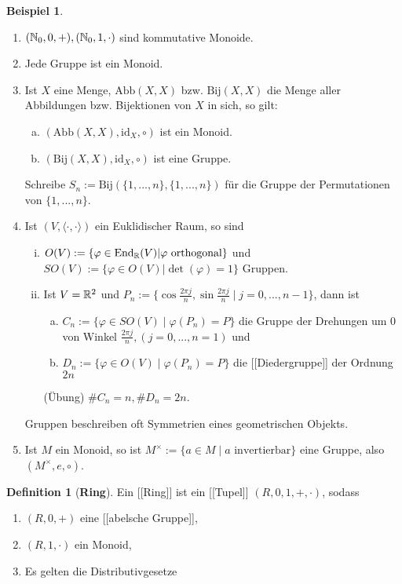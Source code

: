 \documentclass[a4paper]{report}
\theoremstyle{plain}
\theoremstyle{definition}
\newtheorem{defi}[thm]{Definition}
\newtheorem*{bsp*}{Beispiel}
\begin{document}
\begin{bsp*}
  \begin{enumerate}[1)]
\item $(\Bbb N_{0}, 0, +), (\Bbb N_{0}, 1, \cdot)$ sind kommutative Monoide.
\item Jede Gruppe ist ein Monoid.
\item Ist $X$ eine Menge, $\mathrm{Abb}(X,X)$ bzw. $\mathrm{Bij}(X,X)$ die Menge aller Abbildungen bzw. Bijektionen von $X$ in sich, so gilt:
\begin{enumerate}[(a)]
    \item $(\mathrm{Abb}(X,X), \mathrm{id}_{X}, \circ)$ ist ein Monoid.
    \item $(\mathrm{Bij}(X,X), \mathrm{id}_{X}, \circ)$ ist eine Gruppe.
\end{enumerate}
    Schreibe $S_{n}:=\mathrm{Bij}(\{1, ..., n\}, \{1, ..., n\})$ für die Gruppe der Permutationen von $\{1, ..., n\}$.
    \item Ist $(V, \langle \cdot, \cdot \rangle)$ ein Euklidischer Raum, so sind
    \begin{enumerate}[(i)]
    \item $O(V):= \{\varphi \in \mathrm{End}_{\Bbb R}(V) | \varphi \text{ orthogonal}\}$ und $SO(V):= \{\varphi \in O(V) | \det(\varphi) = 1\}$ Gruppen.
    \item Ist $V = \Bbb R^{2}$ und $P_{n}:=\{\cos \frac{2\pi j}{n}, \sin \frac{2\pi j}{n} \mid j = 0, ..., n-1\}$, dann ist
    \begin{enumerate}[(a)]
        \item $C_{n}:= \{\varphi \in SO(V) \mid \varphi(P_{n}) = P\}$ die Gruppe der Drehungen um 0 von Winkel $\frac{2\pi j}{n}, (j=0, ..., n=1)$ und
        \item $D_{n}:= \{\varphi \in O(V) \mid \varphi(P_{n})=P\}$ die [[Diedergruppe]] der Ordnung $2n$

    \end{enumerate}
        (Übung) $\#C_{n} = n, \#D_{n} = 2n$.
    \end{enumerate}
    Gruppen beschreiben oft Symmetrien eines geometrischen Objekts.
\item Ist $M$ ein Monoid, so ist $M^\times:=\{a \in M \mid a \text{ invertierbar}\}$ eine Gruppe, also $(M^{\times}, e, \circ)$.

  \end{enumerate}


\end{bsp*}
\begin{defi}[\textbf{Ring}]
  Ein [[Ring]] ist ein [[Tupel]] $(R, 0, 1, +, \cdot)$, sodass
  \begin{enumerate}[(R1)]
    \item $(R, 0, +)$ eine [[abelsche Gruppe]],
    \item $(R, 1, \cdot)$ ein Monoid,
    \item Es gelten die Distributivgesetze
  \end{enumerate}
\end{defi}
\end{document}
